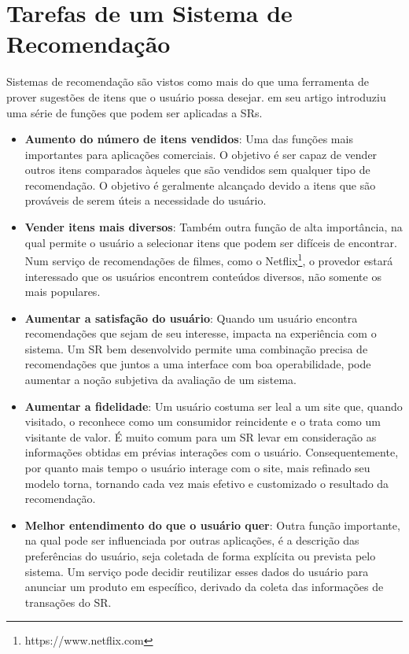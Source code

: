 \section{Tarefas de um Sistema de Recomendação}
\label{sec:tarefasSistemaRecomendacao}

Sistemas de recomendação são vistos como mais do que uma ferramenta de prover sugestões de itens que o usuário possa desejar. \citep{Ricci2011} em seu artigo introduziu uma série de funções que podem ser aplicadas a SRs.

\begin{itemize}
	\item{\textbf{Aumento do número de itens vendidos}: Uma das funções mais importantes para aplicações comerciais. O objetivo é ser capaz de vender outros itens comparados àqueles que são vendidos sem qualquer tipo de recomendação. O objetivo é geralmente alcançado devido a itens que são prováveis de serem úteis a necessidade do usuário.}

	\item{\textbf{Vender itens mais diversos}: Também outra função de alta importância, na qual permite o usuário a selecionar itens que podem ser difíceis de encontrar. Num serviço de recomendações de filmes, como o Netflix\footnote{https://www.netflix.com}, o provedor estará interessado que os usuários encontrem conteúdos diversos, não somente os mais populares.}

	\item{\textbf{Aumentar a satisfação do usuário}: Quando um usuário encontra recomendações que sejam de seu interesse, impacta na experiência com o sistema. Um SR bem desenvolvido permite uma combinação precisa de recomendações que juntos a uma interface com boa operabilidade, pode aumentar a noção subjetiva da avaliação de um sistema.}

	\item{\textbf{Aumentar a fidelidade}: Um usuário costuma ser leal a um site que, quando visitado, o reconhece como um consumidor reincidente e o trata como um visitante de valor. É muito comum para um SR levar em consideração as informações obtidas em prévias interações com o usuário. Consequentemente, por quanto mais tempo o usuário interage com o site, mais refinado seu modelo torna, tornando cada vez mais efetivo e customizado o resultado da recomendação.}

	\item{\textbf{Melhor entendimento do que o usuário quer}: Outra função importante, na qual pode ser influenciada por outras aplicações, é a descrição das preferências do usuário, seja coletada de forma explícita ou prevista pelo sistema. Um serviço pode decidir reutilizar esses dados do usuário para anunciar um produto em específico, derivado da coleta das informações de transações do SR.}
\end{itemize}

